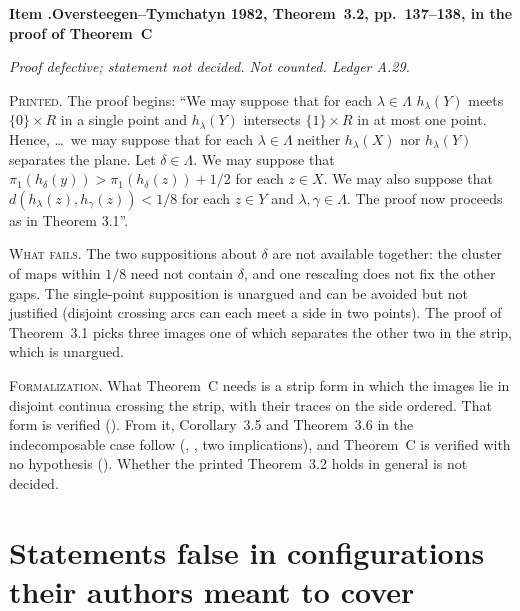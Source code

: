 \documentclass[11pt]{article}
\newcounter{defect}
\newenvironment{defect}[4]{%
  \par\addvspace{10pt}\refstepcounter{defect}%
  \noindent\textbf{Item \thedefect.\enspace #1}\par\nopagebreak
  \noindent\textit{#2}\par\nopagebreak\smallskip}{\par\addvspace{6pt}}
\newcommand{\fld}[1]{\par\noindent\textsc{#1.}\enspace}
\begin{document}
\begin{defect}{Oversteegen--Tymchatyn 1982, Theorem~3.2, pp.~137--138, in the proof of Theorem~C}{Proof defective; statement
not decided. Not counted. Ledger A.29.}{0}{0}\label{it:ot32}

\fld{Printed} The proof begins: ``We may suppose that for each $\lambda\in\Lambda$
$h_\lambda(Y)$ meets $\{0\}\times R$ in a single point and $h_\lambda(Y)$ intersects $\{1\}\times R$
in at most one point. Hence, \ldots\ we may suppose that for each $\lambda\in\Lambda$ neither
$h_\lambda(X)$ nor $h_\lambda(Y)$ separates the plane. Let $\delta\in\Lambda$. We may suppose that
$\pi_1(h_\delta(y))>\pi_1(h_\delta(z))+1/2$ for each $z\in X$. We may also suppose that
$d(h_\lambda(z),h_\gamma(z))<1/8$ for each $z\in Y$ and $\lambda,\gamma\in\Lambda$. The proof now
proceeds as in Theorem 3.1''.

\fld{What fails} The two suppositions about $\delta$ are not available together: the cluster of
maps within $1/8$ need not contain $\delta$, and one rescaling does not fix the other gaps. The
single-point supposition is unargued and can be avoided but not justified (disjoint crossing arcs
can each meet a side in two points). The proof of Theorem~3.1 picks three images one of which
separates the other two in the strip, which is unargued.

\fld{Formalization} What Theorem~C needs is a strip form in which the images lie in disjoint
continua crossing the strip, with their traces on the side ordered. That form is verified
(). From it, Corollary~3.5 and Theorem~3.6 in the indecomposable case follow
(, , two implications), and Theorem~C is
verified with no hypothesis (). Whether the printed Theorem~3.2 holds in general is
not decided.
\end{defect}

\section{Statements false in configurations their authors meant to cover}\label{sec:intended}
\end{document}
